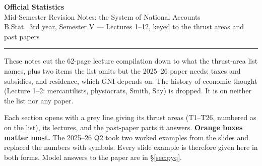 \documentclass[11pt]{article}
\begin{document}
\begin{center}
{\LARGE\bfseries Official Statistics}\\[3pt]
{\large Mid-Semester Revision Notes: the System of National Accounts}\\[2pt]
{\small B.Stat.\ 3rd year, Semester V --- Lectures 1--12, keyed to the thrust areas and past papers}
\end{center}
\vspace{1pt}\hrule\vspace{6pt}

These notes cut the 62-page lecture compilation down to what the thrust-area list names, plus
two items the list omits but the 2025--26 paper needs: taxes and subsidies, and residence, which
GNI depends on. The history of economic thought (Lecture 1--2: mercantilists, physiocrats, Smith,
Say) is dropped. It is on neither the list nor any paper.

Each section opens with a grey line giving its thrust areas (T1--T26, numbered as on the list),
its lectures, and the past-paper parts it answers. \textbf{Orange boxes matter most.} The 2025--26
Q2 took two worked examples from the slides and replaced the numbers with symbols. Every slide
example is therefore given here in both forms. Model answers to the paper are in \S\ref{sec:pyq}.
\end{document}
